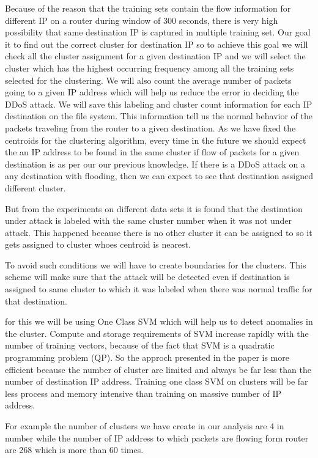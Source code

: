 \documentclass[10pt,oneside,a4paper]{article}
\begin{document}
Because of the reason that the training sets contain the flow information for different IP on a router during window of 300 seconds, there is very high possibility that same destination IP is captured in multiple training set. Our goal it to find out the correct cluster for destination IP so to achieve this goal we will check all the cluster assignment for a given destination IP and we will select the cluster which has the highest occurring frequency among all the training sets selected for the clustering. We will also count the average number of packets going to a given IP address which will help us reduce the error in deciding the DDoS attack. We will save this labeling and cluster count information for each IP destination on the file system. This information tell us the normal behavior of the packets traveling from the router to a given destination. As we have fixed the centroids for the clustering algorithm, every time in the future we should expect the an IP address to be found in the same cluster if flow of packets for a given destination is as per our our previous knowledge. If there is a DDoS attack on a any destination with flooding, then we can expect to see that destination assigned different cluster.

But from the experiments on different data sets it is found that the destination under attack is labeled with the same cluster number when it was not under attack. This happened because there is no other cluster it can be assigned to so it gets assigned to cluster whoes centroid is nearest.

To avoid such conditions we will have to create boundaries for the clusters. This scheme will make sure that the attack will be detected even if destination is assigned to same cluster to which it was labeled when there was normal traffic for that destination.

for this we will be using One Class SVM which will help us to detect anomalies in the cluster. Compute and storage requirements of SVM increase rapidly with the number of training vectors, because of the fact that SVM is a quadratic programming problem (QP). So the approch presented in the paper is more efficient because the number of cluster are limited and always be far less than the number of destination IP address. Training one class SVM on clusters will be far less process and memory intensive than training on massive number of IP address.

For example the number of clusters we have create in our analysis are 4 in number while the number of IP address to which packets are flowing form router are 268 which is more than 60 times.
\end{document}
